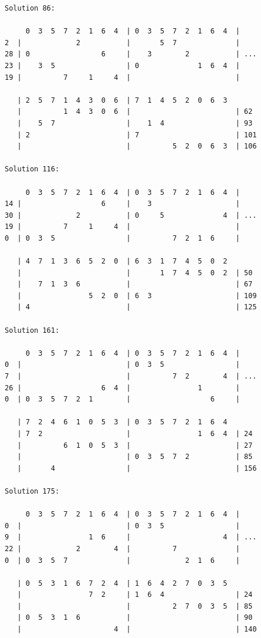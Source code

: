 \begin{lstlisting}[basicstyle=\ttfamily\footnotesize,numbers=none,caption={Output of Listing~\ref{writeSolutions} for problem size four and row $\{0, 3, 5, 7, 2, 1, 6, 4\}$.},label={list:quartet}]
Solution 86:

     0  3  5  7  2  1  6  4  | 0  3  5  7  2  1  6  4  |
2  |             2           |       5  7              |
28 | 0                 6     |    3        2           | ...
23 |    3  5                 | 0              1  6  4  |
19 |          7     1     4  |                         |

   | 2  5  7  1  4  3  0  6  | 7  1  4  5  2  0  6  3  
   |          1  4  3  0  6  |                         | 62
   |    5  7                 |    1  4                 | 93
   | 2                       | 7                       | 101
   |                         |          5  2  0  6  3  | 106

Solution 116:

     0  3  5  7  2  1  6  4  | 0  3  5  7  2  1  6  4  |
14 |                   6     |    3                    |
30 |             2           | 0     5              4  | ...
19 |          7     1     4  |                         |
0  | 0  3  5                 |          7  2  1  6     |

   | 4  7  1  3  6  5  2  0  | 6  3  1  7  4  5  0  2  
   |                         |       1  7  4  5  0  2  | 50
   |    7  1  3  6           |                         | 67
   |                5  2  0  | 6  3                    | 109
   | 4                       |                         | 125

Solution 161:

     0  3  5  7  2  1  6  4  | 0  3  5  7  2  1  6  4  |
0  |                         | 0  3  5                 |
7  |                         |          7  2        4  | ...
26 |                   6  4  |                1        |
0  | 0  3  5  7  2  1        |                   6     |

   | 7  2  4  6  1  0  5  3  | 0  3  5  7  2  1  6  4  
   | 7  2                    |                1  6  4  | 24
   |          6  1  0  5  3  |                         | 27
   |                         | 0  3  5  7  2           | 85
   |       4                 |                         | 156

Solution 175:

     0  3  5  7  2  1  6  4  | 0  3  5  7  2  1  6  4  |
0  |                         | 0  3  5                 |
9  |                1  6     |                      4  | ...
22 |             2        4  |          7              |
0  | 0  3  5  7              |             2  1  6     |

   | 0  5  3  1  6  7  2  4  | 1  6  4  2  7  0  3  5  
   |                7  2     | 1  6  4                 | 24
   |                         |          2  7  0  3  5  | 85
   | 0  5  3  1  6           |                         | 90
   |                      4  |                         | 140
\end{lstlisting}

